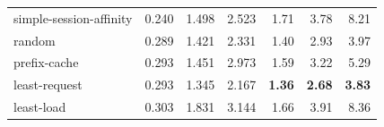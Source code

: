\begin{table}[t]
\begin{tabular}{lrrr|rrr}
simple-session-affinity    & 0.240 & 1.498 & 2.523 & 1.71 & 3.78 & 8.21 \\
random                     & 0.289 & 1.421 & 2.331 & 1.40 & 2.93 & 3.97 \\
prefix-cache               & 0.293 & 1.451 & 2.973 & 1.59 & 3.22 & 5.29 \\
least-request              & 0.293 & 1.345 & 2.167 & \textbf{1.36} & \textbf{2.68} & \textbf{3.83} \\
least-load                 & 0.303 & 1.831 & 3.144 & 1.66 & 3.91 & 8.36 \\
\bottomrule
\end{tabular}
\end{table}

